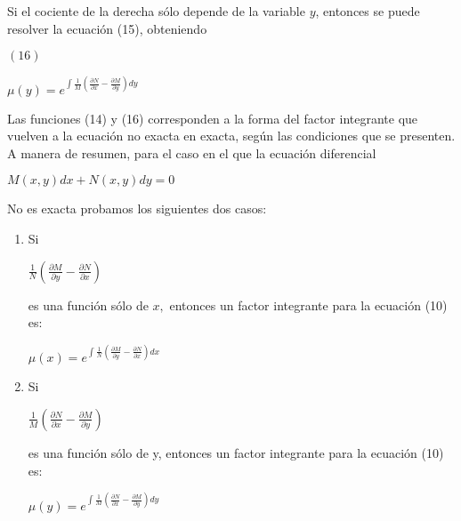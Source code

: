 \documentclass[l etterpaper,11pt]{article}
\begin{document}
Si el cociente de la derecha sólo depende de la variable $ y $, entonces se puede resolver la ecuación (15), obteniendo
\begin{flushleft} 
$(16)$
\end{flushleft}

\begin{center}

$\mu(y)=e^{\int\frac{1}{M}(\frac{\partial N}{\partial x}-\frac{\partial M}{\partial y})dy}$\\
\end{center}

Las funciones (14) y (16) corresponden a la forma del factor integrante que vuelven a la ecuación no exacta en exacta, según las condiciones que se presenten.
A manera de resumen, para el caso en el que la ecuación diferencial
\begin{center}

$M(x,y)dx+N(x,y)dy=0$\\
\end{center}


No es exacta probamos los siguientes dos casos:	
\begin{enumerate}

\item Si
\begin{center}

$\frac{1}{N}(\frac{\partial M}{\partial y}-\frac{\partial N}{\partial x})$\\
\end{center}

es una función sólo de $ x, $ entonces un factor integrante para la ecuación (10) es:

\begin{center}

$\mu\left(x\right)=e^{\int{\frac{1}{N}\left(\frac{\partial M}{\partial y}-\frac{\partial N}{\partial x}\right)dx}}$\\
\end{center}

\item Si
\begin{center}
$\frac{1}{M}(\frac{\partial N}{\partial x}-\frac{\partial M}{\partial y})$\\
\end{center}

es una función sólo de y, entonces un factor integrante para la ecuación (10) es:
\begin{center}

$\mu\left(y\right)=e^{\int{\frac{1}{M}\left(\frac{\partial N}{\partial x}-\frac{\partial M}{\partial y}\right)dy}}$\\
\end{center}

\end{enumerate}
\end{document}
